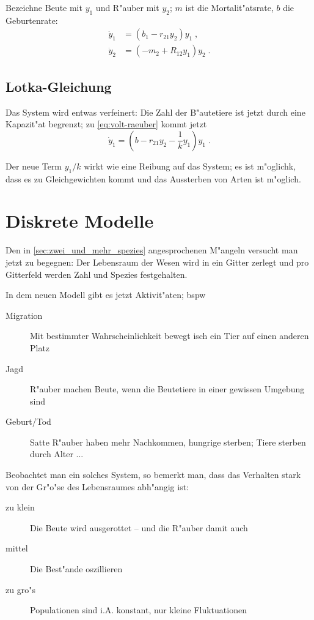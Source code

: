 \documentclass[a4paper]{book}
\begin{document}
Bezeichne Beute mit $y_1$ und R"auber mit $y_2$; $m$ ist die
Mortalit"atsrate, $b$ die Geburtenrate:
\begin{align}
  \label{eq:volt-beute}
  \dot y_1 &= (b_1 - r_{21} y_2 ) y_1 \;,\\
  \label{eq:volt-raeuber}
  \dot y_2 &= (-m_2 + R_{12} y_1 ) y_2 \;.
\end{align}





\subsection{Lotka-Gleichung}
\label{sec:lotka_gleichung}

Das System wird entwas verfeinert: Die Zahl der B"autetiere ist jetzt
durch eine Kapazit"at begrenzt; zu \eqref{eq:volt-raeuber} kommt jetzt
\begin{equation}
  \label{eq:lotka-beute}
  \dot y_1 = (b - r_{21}y_2 - \frac{1}{k} y_1 ) y_1 \;.
\end{equation}

Der neue Term $y_1/k$ wirkt wie eine Reibung auf das System; es ist
m"oglichk, dass es zu Gleichgewichten kommt und das Aussterben von
Arten ist m"oglich.




\section{Diskrete Modelle}
\label{sec:diskrete_modelle}

Den in \ref{sec:zwei_und_mehr_spezies} angesprochenen M"angeln
versucht man jetzt zu begegnen: Der Lebensraum der Wesen wird in ein
Gitter zerlegt und pro Gitterfeld werden Zahl und Spezies
festgehalten.

In dem neuen Modell gibt es jetzt Aktivit"aten; bspw
\begin{description}
\item[Migration] Mit bestimmter Wahrscheinlichkeit bewegt isch ein
  Tier auf einen anderen Platz
\item[Jagd] R"auber machen Beute, wenn die Beutetiere in einer
  gewissen Umgebung sind
\item[Geburt/Tod] Satte R"auber haben mehr Nachkommen, hungrige
  sterben; Tiere sterben durch Alter ...
\end{description}

Beobachtet man ein solches System, so bemerkt man, dass das Verhalten
stark von der Gr"o"se des Lebensraumes abh"angig ist:
\begin{description}
\item[zu klein] Die Beute wird ausgerottet -- und die R"auber damit auch
\item[mittel] Die Best"ande oszillieren
\item[zu gro"s] Populationen sind i.A. konstant, nur kleine Fluktuationen
\end{description}
\end{document}
